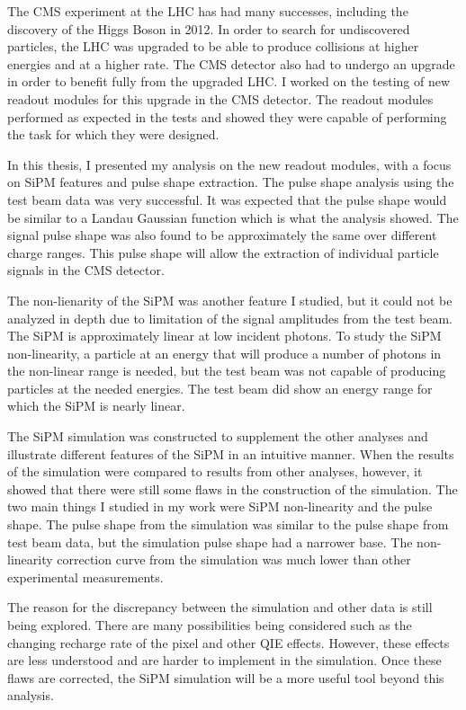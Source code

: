 The CMS experiment at the LHC has had many successes, including the discovery of the Higgs Boson in 2012. In order to search for undiscovered particles, the LHC was upgraded to be able to produce collisions at higher energies and at a higher rate. The CMS detector also had to undergo an upgrade in order to benefit fully from the upgraded LHC. I worked on the testing of new readout modules for this upgrade in the CMS detector. The readout modules performed as expected in the tests and showed they were capable of performing the task for which they were designed. 

In this thesis, I presented my analysis on the new readout modules, with a focus on SiPM features and pulse shape extraction. The pulse shape analysis using the test beam data was very successful. It was expected that the pulse shape would be similar to a Landau Gaussian function which is what the analysis showed. The signal pulse shape was also found to be approximately the same over different charge ranges. This pulse shape will allow the extraction of individual particle signals in the CMS detector. 

The non-lienarity of the SiPM was another feature I studied, but it could not be analyzed in depth due to limitation of the signal amplitudes from the test beam. The SiPM is approximately linear at low incident photons. To study the SiPM non-linearity, a particle at an energy that will produce a number of photons in the non-linear range is needed, but the test beam was not capable of producing particles at the needed energies. The test beam did show an energy range for which the SiPM is nearly linear.

The SiPM simulation was constructed to supplement the other analyses and illustrate different features of the SiPM in an intuitive manner. When the results of the simulation were compared to results from other analyses, however, it showed that there were still some flaws in the construction of the simulation. The two main things I studied in my work were SiPM non-linearity and the pulse shape. The pulse shape from the simulation was similar to the pulse shape from test beam data, but the simulation pulse shape had a narrower base. The non-linearity correction curve from the simulation was much lower than other experimental measurements.

The reason for the discrepancy between the simulation and other data is still being explored. There are many possibilities being considered such as the changing recharge rate of the pixel and other QIE effects. However, these effects are less understood and are harder to implement in the simulation. Once these flaws are corrected, the SiPM simulation will be a more useful tool beyond this analysis. 

